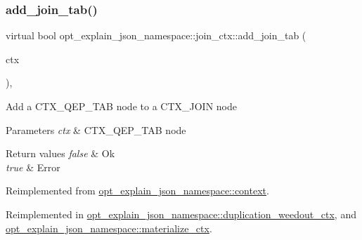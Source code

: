 \subsubsection{\texorpdfstring{add\+\_\+join\+\_\+tab()}{add\_join\_tab()}}
{\footnotesize\ttfamily virtual bool opt\+\_\+explain\+\_\+json\+\_\+namespace\+::join\+\_\+ctx\+::add\+\_\+join\+\_\+tab (\begin{DoxyParamCaption}\item[{\mbox{\hyperlink{classopt__explain__json__namespace_1_1joinable__ctx}{joinable\+\_\+ctx}} $\ast$}]{ctx }\end{DoxyParamCaption})\hspace{0.3cm}{\ttfamily [inline]}, {\ttfamily [virtual]}}

Add a C\+T\+X\+\_\+\+Q\+E\+P\+\_\+\+T\+AB node to a C\+T\+X\+\_\+\+J\+O\+IN node


\begin{DoxyParams}{Parameters}
{\em ctx} & C\+T\+X\+\_\+\+Q\+E\+P\+\_\+\+T\+AB node\\
\hline
\end{DoxyParams}

\begin{DoxyRetVals}{Return values}
{\em false} & Ok \\
\hline
{\em true} & Error \\
\hline
\end{DoxyRetVals}


Reimplemented from \mbox{\hyperlink{classopt__explain__json__namespace_1_1context_a3f7a03f0bf2a519a19b84cb5a99ee304}{opt\+\_\+explain\+\_\+json\+\_\+namespace\+::context}}.



Reimplemented in \mbox{\hyperlink{classopt__explain__json__namespace_1_1duplication__weedout__ctx_a6b1d2505d9f83d8c4fcf56d7b58ebca0}{opt\+\_\+explain\+\_\+json\+\_\+namespace\+::duplication\+\_\+weedout\+\_\+ctx}}, and \mbox{\hyperlink{classopt__explain__json__namespace_1_1materialize__ctx_ac078469c04990cd7639ab09c585809d9}{opt\+\_\+explain\+\_\+json\+\_\+namespace\+::materialize\+\_\+ctx}}.

\mbox{\label{classopt__explain__json__namespace_1_1join__ctx_a5005892466618a6abcc3a5971c1d7433}} 
